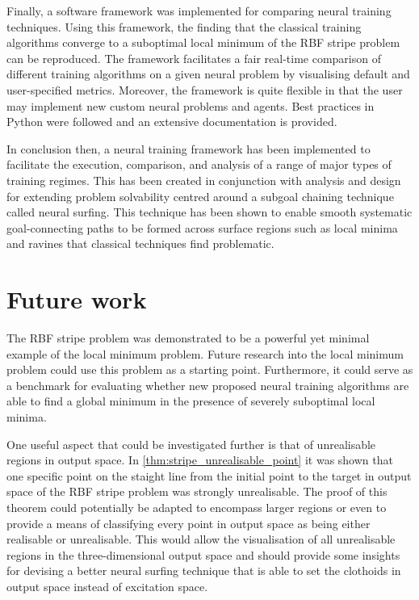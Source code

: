 Finally, a software framework was implemented for comparing neural training techniques.
Using this framework, the finding that the classical training algorithms converge to a suboptimal local minimum of the RBF stripe problem can be reproduced.
The framework facilitates a fair real-time comparison of different training algorithms on a given neural problem by visualising default and user-specified metrics.
Moreover, the framework is quite flexible in that the user may implement new custom neural problems and agents.
Best practices in Python were followed and an extensive documentation is provided.

In conclusion then, a neural training framework has been implemented to facilitate the execution, comparison, and analysis of a range of major types of training regimes.
This has been created in conjunction with analysis and design for extending problem solvability centred around a subgoal chaining technique called neural surfing.
This technique has been shown to enable smooth systematic goal-connecting paths to be formed across surface regions such as local minima and ravines that classical techniques find problematic.

\section{Future work}
\label{sec:future_work}
The RBF stripe problem was demonstrated to be a powerful yet minimal example of the local minimum problem. 
Future research into the local minimum problem could use this problem as a starting point.
Furthermore, it could serve as a benchmark for evaluating whether new proposed neural training algorithms are able to find a global minimum in the presence of severely suboptimal local minima.

One useful aspect that could be investigated further is that of unrealisable regions in output space.
In \ref{thm:stripe_unrealisable_point} it was shown that one specific point on the staight line from the initial point to the target in output space of the RBF stripe problem was strongly unrealisable.
The proof of this theorem could potentially be adapted to encompass larger regions or even to provide a means of classifying every point in output space as being either realisable or unrealisable.
This would allow the visualisation of all unrealisable regions in the three-dimensional output space and should provide some insights for devising a better neural surfing technique that is able to set the clothoids in output space instead of excitation space.

